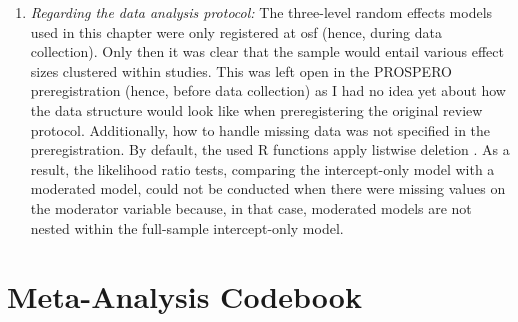 \begin{enumerate}
\item \textit{Regarding the data analysis protocol:} The three-level random effects models used in this chapter were only registered at osf (hence, during data collection). Only then it was clear that the sample would entail various effect sizes clustered within studies. This was left open in the PROSPERO preregistration (hence, before data collection) as I had no idea yet about how the data structure would look like when preregistering the original review protocol. Additionally, how to handle missing data was not specified in the preregistration. By default, the used R functions apply listwise deletion \citep{Cheung2015}. As a result, the likelihood ratio tests, comparing the intercept-only model with a moderated model, could not be conducted when there were missing values on the moderator variable because, in that case, moderated models are not nested within the full-sample intercept-only model.
\end{enumerate}

\newpage

\section{Meta-Analysis Codebook}
\label{app:E2}

